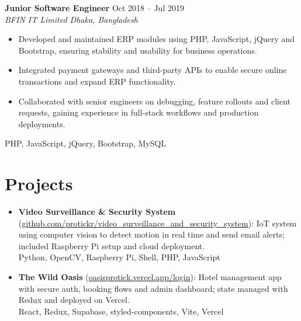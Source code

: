 \documentclass[a4paper,10pt]{article}
\begin{document}
\vspace{2pt}

\textbf{Junior Software Engineer} \hfill Oct 2018 -- Jul 2019\\[-2pt]
\textit{BFIN IT Limited \textbar{} Dhaka, Bangladesh}\\[-4pt]
\begin{itemize}
  \item Developed and maintained ERP modules using PHP, JavaScript, jQuery and Bootstrap, ensuring stability and usability for business operations.
  \item Integrated payment gateways and third-party APIs to enable secure online transactions and expand ERP functionality.
  \item Collaborated with senior engineers on debugging, feature rollouts and client requests, gaining experience in full-stack workflows and production deployments.
\end{itemize}
{\footnotesize\textsf{PHP, JavaScript, jQuery, Bootstrap, MySQL}}

\section*{Projects}
\begin{itemize}
  \item \textbf{Video Surveillance \& Security System} (\href{https://github.com/protickr/video_surveillance_and_security_system}{github.com/protickr/video\_surveillance\_and\_security\_system}): IoT system using computer vision to detect motion in real time and send email alerts; included Raspberry Pi setup and cloud deployment.\\
  {\footnotesize\textsf{Python, OpenCV, Raspberry Pi, Shell, PHP, JavaScript}}
  \vspace{2pt}
  \item \textbf{The Wild Oasis} (\href{https://oasisprotick.vercel.app/login}{oasisprotick.vercel.app/login}): Hotel management app with secure auth, booking flows and admin dashboard; state managed with Redux and deployed on Vercel.\\
  {\footnotesize\textsf{React, Redux, Supabase, styled-components, Vite, Vercel}}
\end{itemize}

\end{document}
